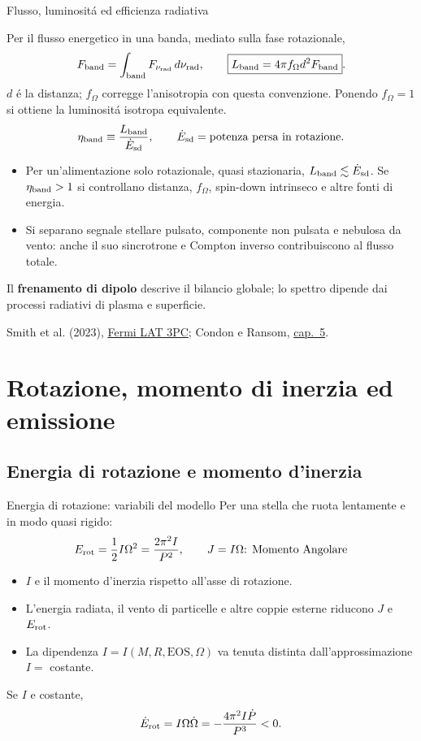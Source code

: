 \begin{frame}[t]{Flusso, luminosit\'a ed efficienza radiativa}
\small\raggedright
Per il flusso energetico in una banda, mediato sulla fase rotazionale,
\[
F_{\rm band}=\int_{\rm band}F_{\nu_{\rm rad}}\,d\nu_{\rm rad},\qquad
\boxed{L_{\rm band}=4\pi f_\Omega d^2F_{\rm band}}.
\]
$d$ \'e la distanza; $f_\Omega$ corregge l'anisotropia con questa convenzione.
Ponendo $f_\Omega=1$ si ottiene la luminosit\'a isotropa equivalente.
\[
\eta_{\rm band}\equiv\frac{L_{\rm band}}{\dot E_{\rm sd}},\qquad
\dot E_{\rm sd}=\text{potenza persa in rotazione}.
\]
\begin{itemize}
\item Per un'alimentazione solo rotazionale, quasi stazionaria,
$L_{\rm band}\lesssim\dot E_{\rm sd}$.
Se $\eta_{\rm band}>1$ si controllano distanza, $f_\Omega$,
spin-down intrinseco e altre fonti di energia.
\item Si separano segnale stellare pulsato, componente non pulsata
e nebulosa da vento: anche il suo sincrotrone e Compton inverso
contribuiscono al flusso totale.
\end{itemize}
Il \textbf{frenamento di dipolo} descrive il bilancio globale;
lo spettro dipende dai processi radiativi di plasma e superficie.
\par\smallskip
\footnotesize Smith et al. (2023), \href{https://arxiv.org/abs/2307.11132}{Fermi LAT 3PC};
Condon e Ransom, \href{https://www.cv.nrao.edu/~sransom/web/Ch5.html}{cap.~5}.
\end{frame}

\section{Rotazione, momento di inerzia ed emissione}

\subsection{Energia di rotazione e momento d'inerzia}

\begin{frame}[t]{Energia di rotazione: variabili del modello}
\small
Per una stella che ruota lentamente e in modo quasi rigido:
\[
E_{\rm rot}=\frac12 I\Omega^2
=\frac{2\pi^2 I}{P^2},\qquad J=I\Omega\text{: Momento Angolare}
\]
\begin{itemize}
\item $I$ e il momento d'inerzia rispetto all'asse di rotazione.
\item L'energia radiata, il vento di particelle e altre coppie esterne riducono $J$ e $E_{\rm rot}$.
\item La dipendenza $I=I(M,R,\mathrm{EOS},\Omega)$ va tenuta distinta dall'approssimazione $I=$ costante.
\end{itemize}
Se $I$ e costante,
\[
\dot E_{\rm rot}=I\Omega\dot\Omega
=-\frac{4\pi^2 I\dot P}{P^3}<0.
\]
\end{frame}

